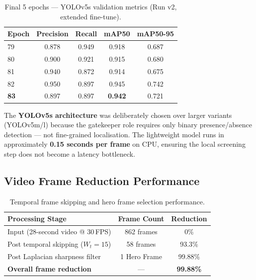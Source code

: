 \begin{table}[htbp]
\centering
\caption{Final 5 epochs — YOLOv5s validation metrics (Run v2, extended fine-tune).}
\label{tab:ch4-yolo-epochs}
\begin{tabular}{lcccc}
\toprule
\textbf{Epoch} & \textbf{Precision} & \textbf{Recall} & \textbf{mAP50} & \textbf{mAP50-95} \\
\midrule
79 & 0.878 & 0.949 & 0.918 & 0.687 \\
80 & 0.900 & 0.921 & 0.915 & 0.680 \\
81 & 0.940 & 0.872 & 0.914 & 0.675 \\
82 & 0.950 & 0.897 & 0.945 & 0.742 \\
\textbf{83} & 0.897 & 0.897 & \textbf{0.942} & 0.721 \\
\bottomrule
\end{tabular}
\end{table}

The \textbf{YOLOv5s architecture} was deliberately chosen over larger variants (YOLOv5m/l) because the gatekeeper role requires only binary presence/absence detection — not fine-grained localisation. The lightweight model runs in approximately \textbf{0.15 seconds per frame} on CPU, ensuring the local screening step does not become a latency bottleneck.

\subsection{Video Frame Reduction Performance}

\begin{table}[htbp]
\centering
\caption{Temporal frame skipping and hero frame selection performance.}
\label{tab:ch4-frames}
\begin{tabular}{lcc}
\toprule
\textbf{Processing Stage} & \textbf{Frame Count} & \textbf{Reduction} \\
\midrule
Input (28-second video @ 30\,FPS)            & 862 frames      & 0\%        \\
Post temporal skipping ($W_t = 15$)          & 58 frames       & 93.3\%     \\
Post Laplacian sharpness filter              & 1 Hero Frame                  & 99.88\%    \\
\midrule
\textbf{Overall frame reduction}             & —               & \textbf{99.88\%} \\
\bottomrule
\end{tabular}
\end{table}

